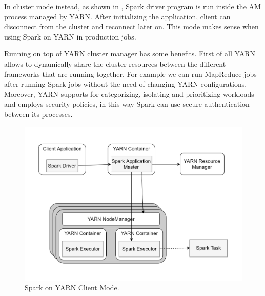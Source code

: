 In cluster mode instead, as shown in , Spark driver program is run inside the AM process managed by YARN. After initializing the application, client can disconnect from the cluster and reconnect later on. This mode makes sense when using Spark on YARN in production jobs. 

Running on top of YARN cluster manager has some benefits. First
of all YARN allows to dynamically share the cluster resources between the different frameworks that are running together. For example we can run MapReduce jobs after running Spark jobs without the need of changing YARN configurations. Moreover, YARN supports for categorizing, isolating and prioritizing workloads and employs security policies, in this way Spark can use secure authentication between its processes.
\begin{figure}
	\vspace{-1cm}
	\centering
	\includegraphics[width=\columnwidth]{Images/spark_yarn_client_mode.pdf}  
	\vspace{-1cm}
	\caption[Spark on YARN Client Mode]{Spark on YARN Client Mode.}
	\label{fig:sparkOnYarnClientMode}
\end{figure}
